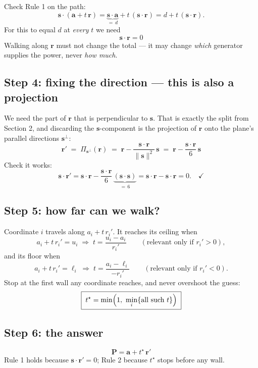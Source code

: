 \documentclass[11pt]{article}
\begin{document}
Check Rule 1 on the path:
\[
\mathbf{s}\cdot(\mathbf{a}+t\,\mathbf{r})
= \underbrace{\mathbf{s}\cdot\mathbf{a}}_{=\,d} + t\,(\mathbf{s}\cdot\mathbf{r})
= d + t\,(\mathbf{s}\cdot\mathbf{r}).
\]
For this to equal $d$ at \emph{every} $t$ we need
\[
\boxed{\;\mathbf{s}\cdot\mathbf{r} = 0\;}
\]
Walking along $\mathbf{r}$ must not change the total --- it may change
\emph{which} generator supplies the power, never \emph{how much}.

\subsection*{Step 4: fixing the direction --- this is also a projection}

We need the part of $\mathbf{r}$ that is perpendicular to $\mathbf{s}$. That is
exactly the split from Section 2, and discarding the $\mathbf{s}$-component is the
projection of $\mathbf{r}$ onto the plane's parallel directions
$\mathbf{s}^{\perp}$:
\[
\boxed{\;\mathbf{r}' \;=\; \Pi_{\mathbf{s}^{\perp}}(\mathbf{r})
\;=\; \mathbf{r} - \frac{\mathbf{s}\cdot\mathbf{r}}{\|\mathbf{s}\|^{2}}\,\mathbf{s}
\;=\; \mathbf{r} - \frac{\mathbf{s}\cdot\mathbf{r}}{6}\,\mathbf{s}\;}
\]
Check it works:
\[
\mathbf{s}\cdot\mathbf{r}'
= \mathbf{s}\cdot\mathbf{r} - \frac{\mathbf{s}\cdot\mathbf{r}}{6}\,\underbrace{(\mathbf{s}\cdot\mathbf{s})}_{=\,6}
= \mathbf{s}\cdot\mathbf{r} - \mathbf{s}\cdot\mathbf{r} = 0 .\quad\checkmark
\]

\subsection*{Step 5: how far can we walk?}

Coordinate $i$ travels along $a_i + t\,r_i'$. It reaches its ceiling when
\[
a_i + t\,r_i' = u_i \;\Longrightarrow\; t = \frac{u_i-a_i}{r_i'}
\qquad (\text{relevant only if } r_i'>0),
\]
and its floor when
\[
a_i + t\,r_i' = \ell_i \;\Longrightarrow\; t = \frac{a_i-\ell_i}{-r_i'}
\qquad (\text{relevant only if } r_i'<0).
\]
Stop at the first wall any coordinate reaches, and never overshoot the guess:
\[
\boxed{\;t^\star = \min\Bigl(1,\ \min_i\{\text{all such } t\}\Bigr)\;}
\]

\subsection*{Step 6: the answer}
\[
\boxed{\;\mathbf{P} = \mathbf{a} + t^\star\,\mathbf{r}'\;}
\]
Rule 1 holds because $\mathbf{s}\cdot\mathbf{r}'=0$; Rule 2 because $t^\star$
stops before any wall.
\end{document}

